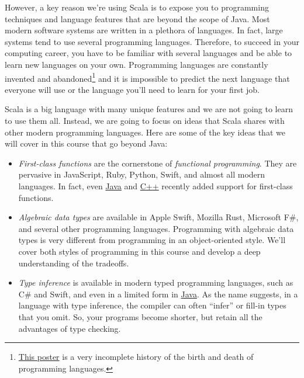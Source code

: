 \documentclass[9pt]{extbook}
\begin{document}
However, a key reason we're using Scala is to expose you to programming techniques
and language features that are beyond the scope of Java. Most
modern software systems are written in a plethora of languages. In fact, large
systems tend to use several programming languages. Therefore, to succeed in your
computing career, you have to be familiar with several languages and be able to
learn new languages on your own. Programming
languages are constantly invented and abandoned\footnote{\href{http://www.oreillynet.com/pub/a/oreilly/news/languageposter_0504.html}{This poster} is a very incomplete history of the birth and death of programming languages.}
 and it is impossible to predict the next language that everyone
will use or the language you'll need to learn for your first job.

Scala is a big language with many unique features and we are not going to learn
to use them all. Instead, we are going to focus on ideas that Scala shares with
other modern programming languages. Here are some of the key ideas that we will
cover in this course that go beyond Java:
%
\begin{itemize}

\item \emph{First-class functions} are the cornerstone of \emph{functional programming}.
  They are pervasive in JavaScript, Ruby, Python, Swift, and almost all modern
  languages.
  In fact, even \href{{http://docs.oracle.com/javase/tutorial/java/javaOO/lambdaexpressions.html}}{Java} and
  \href{https://docs.microsoft.com/en-us/cpp/cpp/lambda-expressions-in-cpp}{C++} recently
  added support for first-class functions.

\item \emph{Algebraic data types} are available in Apple Swift, Mozilla Rust,
  Microsoft F\#, and several other programming languages. Programming with
  algebraic data types is very different from programming in an object-oriented
  style. We'll cover both styles of programming in this course and develop
  a deep understanding of the tradeoffs.

\item \emph{Type inference} is available in modern typed programming languages,
  such as C\# and Swift, and even in a limited form in
  \href{http://docs.oracle.com/javase/tutorial/java/generics/genTypeInference.html}{Java}.
  As the name suggests, in a language with type inference, the compiler can
  often ``infer'' or fill-in types that you omit. So, your programs become shorter, but
  retain all the advantages of type checking.

\end{itemize}
\end{document}
